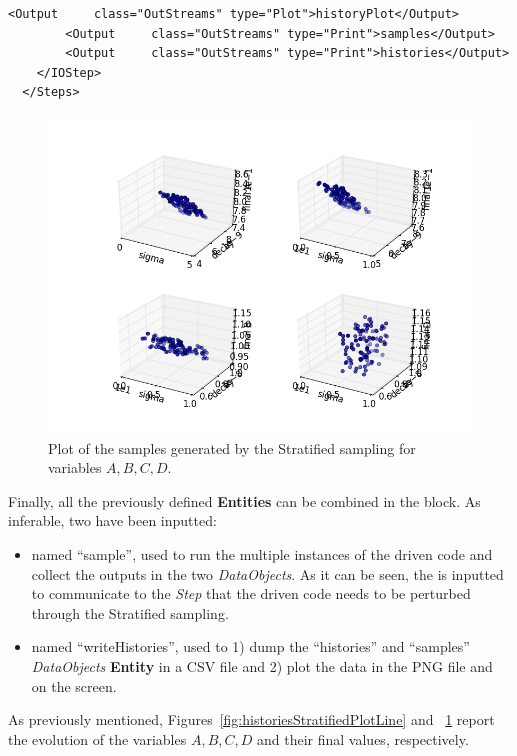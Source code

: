 \begin{enumerate}
\begin{lstlisting}[style=XML,morekeywords={arg,extension,pauseAtEnd,overwrite}]
        <Output 	class="OutStreams" type="Plot">historyPlot</Output>
        <Output 	class="OutStreams" type="Print">samples</Output>
        <Output 	class="OutStreams" type="Print">histories</Output>
    </IOStep>
  </Steps>
\end{lstlisting}
 \begin{figure}[h!]
  \centering
  \includegraphics[scale=0.7]{pics/Stratified_pointsets.png}
  \caption{Plot of the samples generated by the Stratified sampling for variables $A,B,C,D$.}
  \label{fig:samplesStratifiedPlotLine}
 \end{figure}
   Finally, all the previously defined \textbf{Entities} can be combined in 
   the  block. As inferable, 
   two  have been inputted:
   \begin{itemize}
     \item {} named ``sample'', used to run the multiple  
     instances of the driven code and 
     collect the outputs in the two \textit{DataObjects}. As it can be
     seen, the  is inputted to communicate to the 
     \textit{Step} that the driven code needs to
     be perturbed through the Stratified sampling.
     \item  {} named ``writeHistories'', used to 1) dump 
     the ``histories'' and ``samples'' \textit{DataObjects} 
     \textbf{Entity} in a CSV file and 2) plot the data in the PNG file and 
     on the screen.
   \end{itemize}
\end{enumerate} 
 As previously mentioned, Figures~\ref{fig:historiesStratifiedPlotLine} and ~\ref{fig:samplesStratifiedPlotLine}  report the evolution of the 
 variables $A,B,C,D$ and their final values, respectively.

